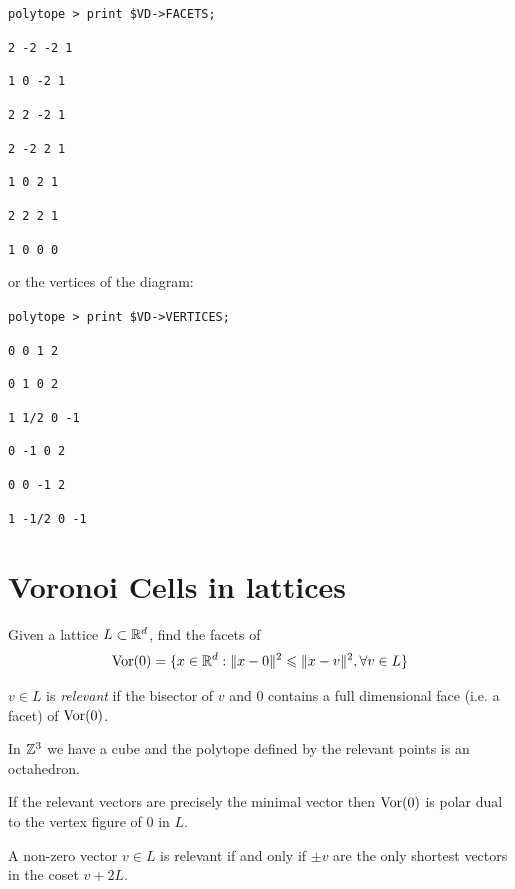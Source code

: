 \texttt{polytope > print \$VD->FACETS;}

\texttt{2 -2 -2 1}

\texttt{1 0 -2 1}

\texttt{2 2 -2 1}

\texttt{2 -2 2 1}

\texttt{1 0 2 1}

\texttt{2 2 2 1}

\texttt{1 0 0 0}

or the vertices of the diagram:

\texttt{polytope > print \$VD->VERTICES;}

\texttt{0 0 1 2}

\texttt{0 1 0 2}

\texttt{1 1/2 0 -1}

\texttt{0 -1 0 2}

\texttt{0 0 -1 2}

\texttt{1 -1/2 0 -1}

\section{Voronoi Cells in lattices}

Given a lattice $L\subset\mathbb{R}^d$, find the facets of $$\operatorname{Vor}(0)=\{x\in\mathbb{R}^d:\|x-0\|^2\leqslant\|x-v\|^2,\forall v\in L\}$$ 

\begin{defn}
 $v\in L$ is \textit{relevant} if the bisector of $v$ and $0$ contains a full dimensional face (i.e. a facet) of $\operatorname{Vor}(0)$.
\end{defn}

In $\mathbb{Z}^3$ we have a cube and the polytope defined by the relevant points is an octahedron.

\begin{obs}
 If the relevant vectors are precisely the minimal vector then $\operatorname{Vor}(0)$ is polar dual to the vertex figure of $0$ in $L$.
\end{obs}

\begin{theorem}
 A non-zero vector $v\in L$ is relevant if and only if $\pm v$ are the only shortest vectors in the coset $v+2L$.
\end{theorem}

